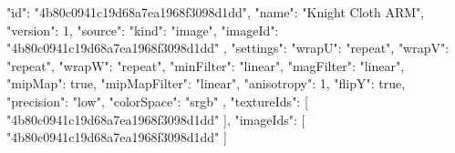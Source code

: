 {
  "id": "4b80c0941c19d68a7ea1968f3098d1dd",
  "name": "Knight Cloth ARM",
  "version": 1,
  "source": {
    "kind": "image",
    "imageId": "4b80c0941c19d68a7ea1968f3098d1dd"
  },
  "settings": {
    "wrapU": "repeat",
    "wrapV": "repeat",
    "wrapW": "repeat",
    "minFilter": "linear",
    "magFilter": "linear",
    "mipMap": true,
    "mipMapFilter": "linear",
    "anisotropy": 1,
    "flipY": true,
    "precision": "low",
    "colorSpace": "srgb"
  },
  "textureIds": [
    "4b80c0941c19d68a7ea1968f3098d1dd"
  ],
  "imageIds": [
    "4b80c0941c19d68a7ea1968f3098d1dd"
  ]
}
